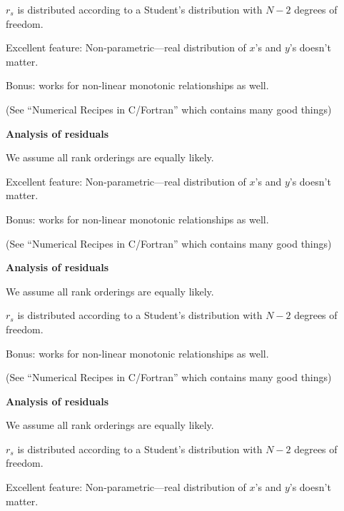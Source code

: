 {\inv

$r_s$ is distributed according to a Student's distribution
with $N-2$ degrees of freedom.

Excellent feature: Non-parametric---real distribution
of $x$'s and $y$'s doesn't matter.

Bonus: works for non-linear monotonic relationships as well.

{\tiny (See ``Numerical Recipes in C/Fortran'' which contains many good things)}

\vis


  \textbf{Analysis of residuals}

We assume all rank orderings are equally likely.


\inv

Excellent feature: Non-parametric---real distribution
of $x$'s and $y$'s doesn't matter.

Bonus: works for non-linear monotonic relationships as well.

{\tiny (See ``Numerical Recipes in C/Fortran'' which contains many good things)}

\vis


  \textbf{Analysis of residuals}

We assume all rank orderings are equally likely.

$r_s$ is distributed according to a Student's distribution
with $N-2$ degrees of freedom.


\inv

Bonus: works for non-linear monotonic relationships as well.

{\tiny (See ``Numerical Recipes in C/Fortran'' which contains many good things)}

\vis


  \textbf{Analysis of residuals}

We assume all rank orderings are equally likely.

$r_s$ is distributed according to a Student's distribution
with $N-2$ degrees of freedom.

Excellent feature: Non-parametric---real distribution
of $x$'s and $y$'s doesn't matter.


}
